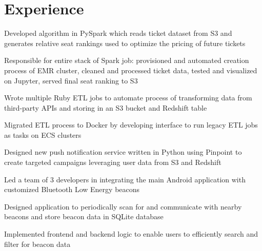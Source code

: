 \documentclass[letterpaper]{deedy-resume}
\begin{document}
\hfill
%
%
\begin{minipage}[t]{0.66\textwidth}

\section{Experience}


\vspace{0.35cm}
\begin{tightitemize}
\item Developed algorithm in PySpark which reads ticket dataset from S3 and generates relative seat rankings used to optimize the pricing of future tickets
\item Responsible for entire stack of Spark job: provisioned and automated creation process of EMR cluster, cleaned and processed ticket data, tested and visualized on Jupyter, served final seat ranking to S3
\item Wrote multiple Ruby ETL jobs to automate process of transforming data from third-party APIs and storing in an S3 bucket and Redshift table
\item Migrated ETL process to Docker by developing interface to run legacy ETL jobs as tasks on ECS clusters
\item Designed new push notification service written in Python using Pinpoint to create targeted campaigns leveraging user data from S3 and Redshift
\end{tightitemize}

\sectionspace


\begin{tightitemize}
\item Led a team of 3 developers in integrating the main Android application with customized Bluetooth Low Energy beacons
\item Designed application to periodically scan for and communicate with nearby beacons and store beacon data in SQLite database
\item Implemented frontend and backend logic to enable users to efficiently search and filter for beacon data
\end{tightitemize}


\end{minipage}
\end{document}

